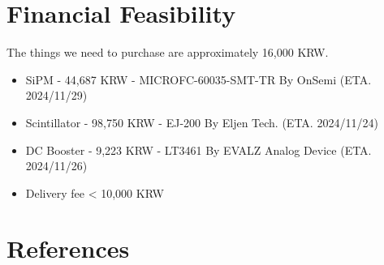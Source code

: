 \documentclass{article}
\begin{document}
\section{Financial Feasibility}
The things we need to purchase are approximately 16,000 KRW.
\begin{itemize}
    \item SiPM - 44,687 KRW -  MICROFC-60035-SMT-TR By OnSemi (ETA. 2024/11/29)
    \item Scintillator - 98,750 KRW - EJ-200 By Eljen Tech. (ETA. 2024/11/24)
    \item DC Booster - 9,223 KRW - LT3461 By EVALZ Analog Device (ETA. 2024/11/26)
    \item Delivery fee < 10,000 KRW
\end{itemize}



\section{References}
 

\end{document}
